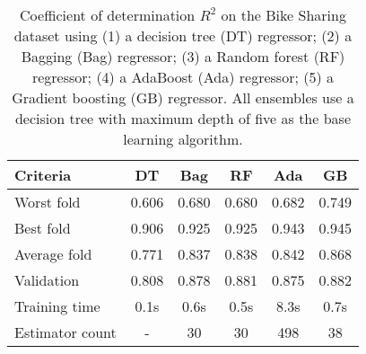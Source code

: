 \begin{table}[htbp]
    \centering
    \begin{tabular}{l c c c c c}
    \toprule
    Criteria        & DT    & Bag       & RF    & Ada   & GB \\
    \midrule
    Worst fold      & 0.606 & 0.680     & 0.680 & 0.682 & 0.749\\
    Best fold       & 0.906 & 0.925     & 0.925 & 0.943 & 0.945\\
    Average fold    & 0.771 & 0.837     & 0.838 & 0.842 & 0.868\\
    Validation      & 0.808 & 0.878     & 0.881 & 0.875 & 0.882\\
    Training time   & 0.1s  & 0.6s      & 0.5s  & 8.3s  & 0.7s\\
    Estimator count & -     & 30        & 30    & 498   & 38\\
    \bottomrule
    \end{tabular}
    \caption{
        Coefficient of determination $R^2$ on the Bike Sharing dataset using 
        (1) a decision tree (DT) regressor;
        (2) a Bagging (Bag) regressor;
        (3) a Random forest (RF) regressor; 
        (4) a AdaBoost (Ada) regressor; 
        (5) a Gradient boosting (GB) regressor.
        All ensembles use a decision tree with maximum depth of five as 
        the base learning algorithm.
    }
\end{table}